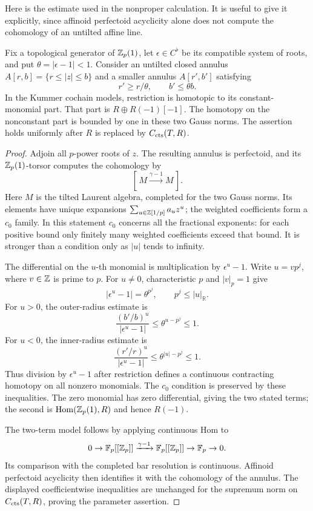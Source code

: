 Here is the estimate used in the nonproper calculation.  It is useful
to give it explicitly, since affinoid perfectoid acyclicity alone does
not compute the cohomology of an untilted affine line.

\begin{lemma}\label{h3:ana:annulus-contraction}
Fix a topological generator of $\mathbb Z_p(1)$, let $\epsilon\in C^\flat$
be its compatible system of roots, and put $\theta=|\epsilon-1|<1$.
Consider an untilted closed annulus
$A[r,b]=\{r\leq |z|\leq b\}$ and a smaller annulus
$A[r',b']$ satisfying
\[
 r'\geq r/\theta,\qquad b'\leq\theta b.
\]
In the Kummer cochain models, restriction is homotopic to its
constant-monomial part.  That part is
$R\oplus R(-1)[-1]$.  The homotopy on the nonconstant part is
bounded by one in these two Gauss norms.  The assertion holds
uniformly after $R$ is replaced by $C_{\mathrm{cts}}(T,R)$.
\end{lemma}
\begin{proof}
Adjoin all $p$-power roots of $z$.  The resulting annulus is
perfectoid, and its $\mathbb Z_p(1)$-torsor computes the cohomology by
\[
 [\,M\xrightarrow{\gamma-1}M\,].
\]
Here $M$ is the tilted Laurent algebra, completed for the two Gauss
norms.  Its elements have unique expansions
$\sum_{u\in\mathbb Z[1/p]}a_u z^u$; the weighted coefficients form a
$c_0$ family.  In this statement $c_0$ concerns all the fractional
exponents: for each positive bound only finitely many weighted
coefficients exceed that bound.  It is stronger than a condition
only as $|u|$ tends to infinity.

The differential on the $u$-th monomial is multiplication by
$\epsilon^u-1$.  Write $u=v p^j$, where $v\in\mathbb Z$ is prime to $p$.
For $u\ne0$, characteristic $p$ and $|v|_p=1$ give
\[
 |\epsilon^u-1|=\theta^{p^j},\qquad p^j\leq |u|_{\mathbb R}.
\]
For $u>0$, the outer-radius estimate is
\[
 \frac{(b'/b)^u}{|\epsilon^u-1|}
 \leq\theta^{u-p^j}\leq1.
\]
For $u<0$, the inner-radius estimate is
\[
 \frac{(r'/r)^u}{|\epsilon^u-1|}
 \leq\theta^{|u|-p^j}\leq1.
\]
Thus division by $\epsilon^u-1$ after restriction defines a
continuous contracting homotopy on all nonzero monomials.  The
$c_0$ condition is preserved by these inequalities.  The zero
monomial has zero differential, giving the two stated terms;
the second is $\operatorname{Hom}(\mathbb Z_p(1),R)$ and hence $R(-1)$.

The two-term model follows by applying continuous Hom to
\[
0\to\mathbb F_p[[\mathbb Z_p]]\xrightarrow{\gamma-1}\mathbb F_p[[\mathbb Z_p]]\to\mathbb F_p\to0.
\]
Its comparison with the completed bar resolution is continuous.
Affinoid perfectoid acyclicity
\cite[Proposition~8.8]{ScholzeDiamonds} then identifies it with the
cohomology of the annulus.  The displayed coefficientwise
inequalities are unchanged for the supremum norm on
$C_{\mathrm{cts}}(T,R)$, proving the parameter assertion.
\end{proof}

